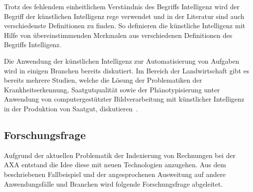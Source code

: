 \documentclass{hwz}
\begin{document}
Trotz des fehlendem einheitlichem Verständnis des Begriffs Intelligenz wird der Begriff der künstlichen Intelligenz rege verwendet und in der Literatur sind auch verschiedenste Definitionen zu finden. So definieren \textcite{Legg2007UniversalIntelligence} die künstliche Intelligenz mit Hilfe von übereinstimmenden Merkmalen aus verschiedenen Definitionen des Begriffs Intelligenz. 


Die Anwendung der künstlichen Intelligenz zur Automatisierung von Aufgaben wird in einigen Branchen bereits diskutiert. Im Bereich der Landwirtschaft gibt es bereits mehrere Studien, welche die Lösung der Problematiken der Krankheitserkennung, Saatgutqualität sowie der Phänotypisierung unter Anwendung von computergestützter Bildverarbeitung mit künstlicher Intelligenz in der Produktion von Saatgut, diskutieren~\autocite{Patricio2018ComputerReview}. 

\subsection{Forschungsfrage}

Aufgrund der aktuellen Problematik der Indexierung von Rechnungen bei der AXA entstand die Idee diese mit neuen Technologien anzugehen. Aus dem beschriebenen Fallbeispiel und der angesprochenen Ausweitung auf andere Anwendungsfälle und Branchen wird folgende Forschungsfrage abgeleitet.

{
    \medskip
    \setlength{\fboxsep}{1em}
    \noindent{}
    \medskip
}
\end{document}
